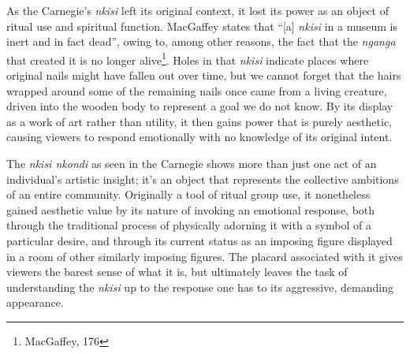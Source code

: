 As the Carnegie's \textit{nkisi} left its original context, it lost
its power as an object of ritual use and spiritual function. MacGaffey states
that ``[a] \textit{nkisi} in a museum is inert and in fact dead'', owing to,
among other reasons, the fact that the \textit{nganga} that created it is
no longer alive\footnote{MacGaffey, 176}. Holes in that \textit{nkisi} indicate
places where original nails might have fallen out over time, but we cannot
forget that the hairs wrapped around some of the remaining nails once came from
a living creature, driven into the wooden body to represent a goal we do not
know. By its display as a work of art rather than utility, it then gains power
that is purely aesthetic, causing viewers to respond emotionally with no
knowledge of its original intent.

The \textit{nkisi nkondi} as seen in the Carnegie shows more than just one
act of an individual's artistic insight; it's an object that represents the
collective ambitions of an entire community. Originally a tool of ritual group
use, it nonetheless gained aesthetic value by its nature of invoking an
emotional response, both through the traditional process of physically adorning
it with a symbol of a particular desire, and through its current status as an
imposing figure displayed in a room of other similarly imposing figures. The
placard associated with it gives viewers the barest sense of what it is, but
ultimately leaves the task of understanding the \textit{nkisi} up to the
response one has to its aggressive, demanding appearance.
